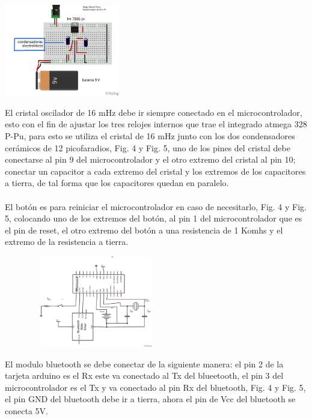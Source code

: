 \documentclass[12pt]{article}
\newenvironment{Figure}
{\par\medskip\noindent\minipage{\linewidth}}
{\endminipage\par\medskip}
\begin{document}
\begin{multicols}{2}
\begin{Figure}
\center
\includegraphics[width=7.cm, height=4cm]{fig/montajetr5V.png}
\label{fig:g3}
\end{Figure}

El cristal oscilador de 16 mHz debe ir siempre conectado en el microcontrolador, esto  con el fin de ajustar los tres relojes internos que trae el integrado atmega 328 P-Pu, para esto se utiliza el cristal de 16 mHz junto con los dos condensadores cerámicos de 12 picofaradios, Fig. 4 y Fig. 5,  uno de los pines del cristal debe conectarse al pin 9 del microcontrolador y el otro extremo del cristal al pin 10; conectar un capacitor a cada extremo del cristal y los extremos de los capacitores a tierra, de tal forma que los capacitores quedan en paralelo. 
\\ \\
El botón es para reiniciar el microcontrolador en caso de necesitarlo, Fig. 4 y Fig. 5, colocando uno de los extremos del botón, al pin 1 del microcontrolador que es el pin de reset, el otro extremo del botón a una resistencia de 1 Komhs y el extremo de la resistencia a tierra.

\begin{Figure}
\center
\includegraphics[width=8cm, height=4cm]{fig/bluetoothesq.png} 
\label{fig:g4}
\end{Figure}

El modulo bluetooth se debe conectar de la siguiente manera: el pin 2 de la tarjeta arduino es el Rx este va conectado al Tx del blueetooth, el pin 3 del microcontrolador es el Tx y va conectado al pin Rx del bluetooth, Fig. 4 y Fig. 5, el pin GND del bluetooth debe ir a tierra, ahora el pin de Vcc del bluetooth se conecta 5V. 


\end{multicols}
\end{document}
